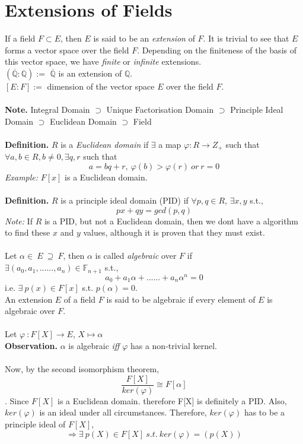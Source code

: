 \documentclass[twoside]{article}
\begin{document}
\section{Extensions of Fields}
    If a field $F \subset E$, then $E$ is said to be an {\it extension} of $F$.
    It is trivial to see that $E$ forms a vector space over the field $F$. Depending on the finiteness of the basis of this vector space, we have {\it finite} or {\it infinite} extensions.\\
    $(\overline{\mathbb{Q}} : \mathbb{Q}) :=$ $\overline{\mathbb{Q}}$ is an extension of $\mathbb{Q}$.\\
    $[E:F] :=$ dimension of the vector space $E$ over the field $F$.\\
    \\
    {\bf Note.} Integral Domain $\supset$ Unique Factorisation Domain $\supset$ Principle Ideal Domain $\supset$ Euclidean Domain $\supset$ Field\\
    \\
    {\bf Definition.} $R$ is a {\it Euclidean domain} if $\exists$ a map $\varphi :R\to Z_+$ such that $\forall a,b\in R, b\neq 0, \exists q,r$ such that $$a = bq+r,\ \varphi(b)>\varphi(r)\ or\ r=0$$
    {\it Example:} $F[x]$ is a Euclidean domain.\\
    \\
    {\bf Definition.} $R$ is a principle ideal domain (PID) if $\forall p,q\in R$, $\exists x,y$ s.t., $$ px+qy=gcd(p,q)$$
    {\it Note:} If $R$ is a PID, but not a Euclidean domain, then we dont have a algorithm to find these $x$ and $y$ values, although it is proven that they must exist.\\
    \\
    Let $\alpha \in\ E\ \supseteq\ F$, then $\alpha$ is called {\it algebraic} over $F$ if\\ $\exists ({a_0}, {a_1}, ...... , {a_n}) \in {{\mathbb{F}}_{n+1}}$ s.t., $${a_0}+{a_1}\alpha+ ......+{a_n}{{\alpha}^n}=0$$ i.e. $\exists\ p(x) \in F[x]$ s.t. $p(\alpha)=0$.\\
    An extension $E$ of a field $F$ is said to be algebraic if every element of $E$ is algebraic over $F$.\\
    \\
    Let $\varphi\ : F[X]\to E$, $ X\mapsto\alpha$ \\
    {\bf Observation.} $\alpha$ is algebraic {\it iff} $\varphi$ has a non-trivial kernel.\\
    \\
    Now, by the second isomorphism theorem, $$\frac{F[X]}{ker(\varphi)} \cong F[\alpha]$$. Since $F[X]$ is a Euclidean domain. therefore F[X] is definitely a PID. Also, $ker(\varphi)$ is an ideal under all circumstances. Therefore, $ker(\varphi)$ has to be a principle ideal of $F[X]$, $$\Rightarrow \exists\  p(X)\in F[X]\ s.t.\ ker(\varphi)= \left(p(X)\right)$$
\end{document}
